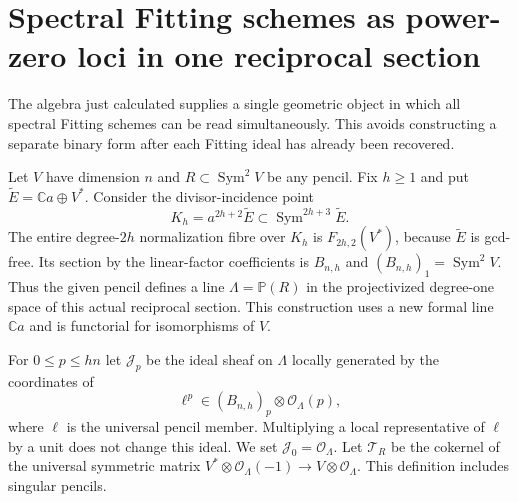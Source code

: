 \documentclass[11pt,reqno]{amsart}
\numberwithin{equation}{section}
\theoremstyle{definition}\newtheorem{definition}[theorem]{Definition}
\theoremstyle{remark}\newtheorem{remark}[theorem]{Remark}
\newcommand{\C}{\mathbb C}\newcommand{\Q}{\mathbb Q}
\newcommand{\Pj}{\mathbb P}\newcommand{\A}{\mathbb A}
\newcommand{\OO}{\mathcal O}\newcommand{\II}{\mathcal I}
\DeclareMathOperator{\Sym}{Sym}\DeclareMathOperator{\Gr}{Gr}
\begin{document}
\section{Spectral Fitting schemes as power-zero loci in one reciprocal section}
\label{sec:power-spectral-v155}
The algebra just calculated supplies a single geometric object in
which all spectral Fitting schemes can be read simultaneously.
This avoids constructing a separate binary form after each Fitting
ideal has already been recovered.

Let $V$ have dimension $n$ and $R\subset\Sym^2V$ be any pencil.
Fix $h\geq1$ and put $\widetilde E=\C a\oplus V^*$.
Consider the divisor-incidence point
\begin{equation}\label{eq:canonical-reciprocal-point-v155}
 K_h=a^{2h+2}\widetilde E
         \subset\Sym^{2h+3}\widetilde E.
\end{equation}
The entire degree-$2h$ normalization fibre over $K_h$ is
$F_{2h,2}(V^*)$, because $\widetilde E$ is gcd-free.  Its section
by the linear-factor coefficients is $B_{n,h}$ and
$(B_{n,h})_1=\Sym^2V$.  Thus the given pencil defines a line
$\Lambda=\Pj(R)$ in the projectivized degree-one space of this
actual reciprocal section.  This construction uses a new formal
line $\C a$ and is functorial for isomorphisms of $V$.

For $0\leq p\leq hn$ let $\mathcal J_p$ be the ideal sheaf on
$\Lambda$ locally generated by the coordinates of
\begin{equation}\label{eq:power-map-v155}
       \ell^p\in(B_{n,h})_p\otimes\OO_\Lambda(p),
\end{equation}
where $\ell$ is the universal pencil member.  Multiplying a local
representative of $\ell$ by a unit does not change this ideal.
We set $\mathcal J_0=\OO_\Lambda$.
Let $\mathcal T_R$ be the cokernel of the universal symmetric
matrix $V^*\otimes\OO_\Lambda(-1)\to V\otimes\OO_\Lambda$.
This definition includes singular pencils.
\end{document}
